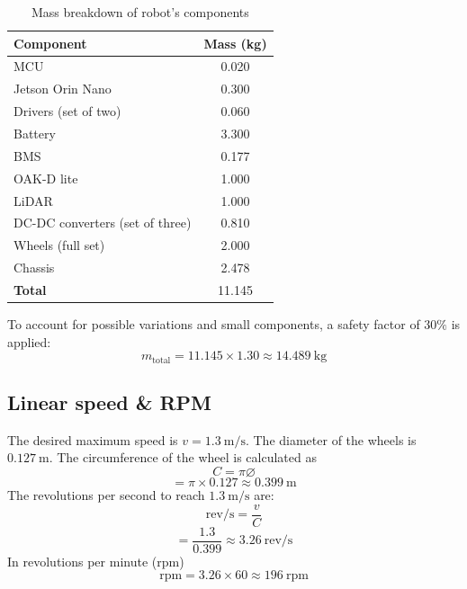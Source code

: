 \begin{table}[H]
  \centering
  \begin{tabular}{@{}l S[table-format=1.3]}
    \toprule
    \textbf{Component}              & \textbf{Mass (\si{\kilogram})} \\
    \midrule
    MCU                             & 0.020                          \\
    Jetson Orin Nano                & 0.300                          \\
    Drivers (set of two)            & 0.060                          \\
    Battery                         & 3.300                          \\
    BMS                             & 0.177                          \\
    OAK-D lite                      & 1.000                          \\
    LiDAR                           & 1.000                          \\
    DC-DC converters (set of three) & 0.810                          \\
    Wheels (full set)               & 2.000                          \\
    Chassis                         & 2.478                          \\
    \midrule
    \textbf{Total}                  & 11.145                         \\
    \bottomrule
  \end{tabular}
  \caption{Mass breakdown of robot's components}
  \label{tab:component-masses}
\end{table}

To account for possible variations and small components, a safety factor of $30\%$ is applied:
\[
  m_{\text{total}} = 11.145 \times 1.30 \approx 14.489\ \mathrm{kg}
\]

\subsection{Linear speed \& RPM}

The desired maximum speed is \( v = 1.3\ \mathrm{m/s} \).
The diameter of the wheels is \(0.127\ \mathrm{m} \).
The circumference of the wheel is calculated as
\begin{equation}
  C = \pi \diameter
\end{equation}
\[
  = \pi \times 0.127 \approx 0.399\ \mathrm{m}
\]
The revolutions per second to reach \( 1.3\ \mathrm{m/s} \) are:
\begin{equation}
  \text{rev/s} = \frac{v}{C}
\end{equation}
\[
  = \frac{1.3}{0.399} \approx 3.26\ \mathrm{rev/s}
\]
In revolutions per minute (rpm)
\[
  \text{rpm} = 3.26 \times 60 \approx 196\ \mathrm{rpm}
\]

